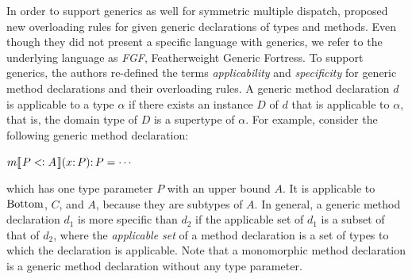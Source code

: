 In order to support generics as well for symmetric multiple dispatch,
\citet{oopsla11} proposed new overloading rules for given generic
declarations of types and methods.  Even though they did not
present a specific language with generics, we refer to the underlying
language as \textit{FGF}, Featherweight Generic Fortress.
To support generics, the authors
re-defined the terms \emph{applicability} and \emph{specificity} for
generic method declarations and their overloading rules.  A generic
method declaration $d$ is applicable to a type $\alpha$ if there exists
an instance $D$ of $d$ that is applicable to $\alpha$, that is, the
domain type of $D$ is a supertype of $\alpha$.  For example, consider
the following generic method declaration:
\begin{center}
$m\ob{P \extends A}(x \COLON P) \COLON P = \cdots$
\end{center}
which has one type parameter $P$ with an upper bound $A$.  It is
applicable to $\mathord{\mathrm{Bottom}}$, $C$, and $A$, because they are subtypes of $A$.
In general,
a generic method declaration $d_1$ is more specific than
$d_2$ if the applicable set of $d_1$ is a subset of that of $d_2$, where
the \textit{applicable set} of a method declaration is a set of types
to which the declaration is applicable.
Note that a monomorphic
method declaration is a generic method declaration without any type
parameter.


